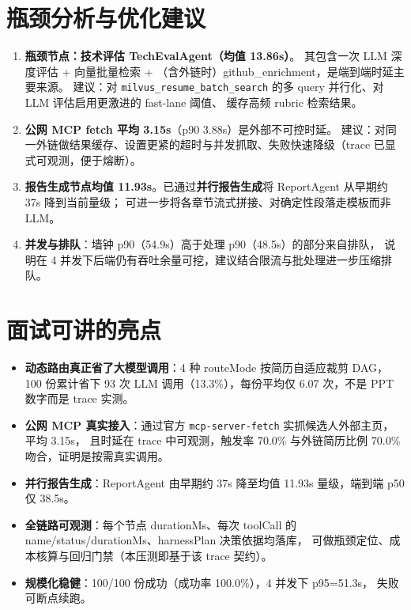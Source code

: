\documentclass[11pt,a4paper]{ctexart}
\begin{document}
\section{瓶颈分析与优化建议}
\begin{enumerate}[leftmargin=1.6em]
  \item \textbf{瓶颈节点：技术评估 TechEvalAgent（均值 13.86s）}。
  其包含一次 LLM 深度评估 + 向量批量检索 + （含外链时）github\_enrichment，是端到端时延主要来源。
  建议：对 \texttt{milvus\_resume\_batch\_search} 的多 query 并行化、对 LLM 评估启用更激进的 fast-lane 阈值、
  缓存高频 rubric 检索结果。
  \item \textbf{公网 MCP fetch 平均 3.15s}（p90 3.88s）是外部不可控时延。
  建议：对同一外链做结果缓存、设置更紧的超时与并发抓取、失败快速降级（trace 已显式可观测，便于熔断）。
  \item \textbf{报告生成节点均值 11.93s}。已通过\textbf{并行报告生成}将 ReportAgent 从早期约 37s 降到当前量级；
  可进一步将各章节流式拼接、对确定性段落走模板而非 LLM。
  \item \textbf{并发与排队}：墙钟 p90（54.9s）高于处理 p90（48.5s）的部分来自排队，
  说明在 4 并发下后端仍有吞吐余量可挖，建议结合限流与批处理进一步压缩排队。
\end{enumerate}

\section{面试可讲的亮点}
\begin{itemize}[leftmargin=1.4em]
  \item \textbf{动态路由真正省了大模型调用}：4 种 routeMode 按简历自适应裁剪 DAG，
  100 份累计省下 93 次 LLM 调用（13.3\%），每份平均仅 6.07 次，不是 PPT 数字而是 trace 实测。
  \item \textbf{公网 MCP 真实接入}：通过官方 \texttt{mcp-server-fetch} 实抓候选人外部主页，平均 3.15s，
  且时延在 trace 中可观测，触发率 70.0\% 与外链简历比例 70.0\% 吻合，证明是按需真实调用。
  \item \textbf{并行报告生成}：ReportAgent 由早期约 37s 降至均值 11.93s 量级，端到端 p50 仅 38.5s。
  \item \textbf{全链路可观测}：每个节点 durationMs、每次 toolCall 的 name/status/durationMs、harnessPlan 决策依据均落库，
  可做瓶颈定位、成本核算与回归门禁（本压测即基于该 trace 契约）。
  \item \textbf{规模化稳健}：100/100 份成功（成功率 100.0\%），4 并发下 p95=51.3s，
  失败可断点续跑。
\end{itemize}
\end{document}
